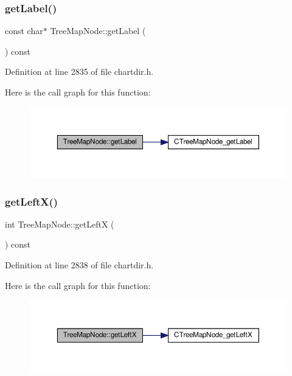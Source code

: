\subsubsection{\texorpdfstring{get\+Label()}{getLabel()}}
{\footnotesize\ttfamily const char$\ast$ Tree\+Map\+Node\+::get\+Label (\begin{DoxyParamCaption}{ }\end{DoxyParamCaption}) const\hspace{0.3cm}{\ttfamily [inline]}}



Definition at line 2835 of file chartdir.\+h.

Here is the call graph for this function\+:
\nopagebreak
\begin{figure}[H]
\begin{center}
\leavevmode
\includegraphics[width=350pt]{class_tree_map_node_a716c1465852f037e6b75e14b8865b841_cgraph}
\end{center}
\end{figure}
\mbox{\label{class_tree_map_node_add0c62f94c829afa5034cd0992c8f2d7}} 
\subsubsection{\texorpdfstring{get\+Left\+X()}{getLeftX()}}
{\footnotesize\ttfamily int Tree\+Map\+Node\+::get\+LeftX (\begin{DoxyParamCaption}{ }\end{DoxyParamCaption}) const\hspace{0.3cm}{\ttfamily [inline]}}



Definition at line 2838 of file chartdir.\+h.

Here is the call graph for this function\+:
\nopagebreak
\begin{figure}[H]
\begin{center}
\leavevmode
\includegraphics[width=350pt]{class_tree_map_node_add0c62f94c829afa5034cd0992c8f2d7_cgraph}
\end{center}
\end{figure}
\mbox{\label{class_tree_map_node_adae867bee5a1cdf5fe3b632b9a55da65}} 
